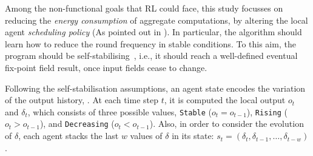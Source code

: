Among the non-functional goals that \ac{RL} could face, 
 this study %
 focusses on reducing the \emph{energy consumption} of aggregate computations,
 by altering the local agent \emph{scheduling policy} (As pointed out in ).
%
%
%
In particular, the algorithm should learn how to reduce the round frequency in stable conditions. 
 To this aim, the program should be self-stabilising~\cite{DBLP:journals/tomacs/ViroliABDP18}, 
 i.e., it should reach a well-defined eventual fix-point field result, once input fields cease to change.

 Following the self-stabilisation assumptions, an agent state encodes the variation of the output history, .
 At each time step $t$, it is computed the local output $o_t$ and $\delta_t$, which consists of three possible values, \texttt{Stable} ($o_t = o_{t-1}$), \texttt{Rising} ($o_t > o_{t-1}$), and \texttt{Decreasing} ($o_ t < o_{t-1}$).
Also, in order to consider the evolution of $\delta$, each agent stacks the last $w$ values of $\delta$ in its state: $s_t =(\delta_t, \delta_{t-1}, \dots, \delta_{t-w})$.

